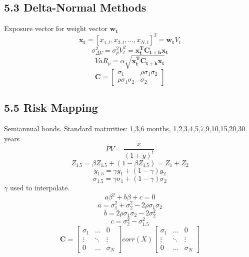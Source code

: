 \subsection*{5.3 Delta-Normal Methods}
Exposure vector for weight vector $\mathbf{w_t}$
\[\mathbf{x_t}=[x_{1,t}, x_{2,t}, ..., x_{N,t}]^T=\mathbf{w_t}V_t\]
\[\sigma_{\Delta V}^2 = \sigma_p^2 V_t^2 = \mathbf{x_t^T C_{t+h}x_t}\]
\[VaR_p = \alpha\sqrt{\mathbf{x_t^T C_{t+h}x_t}}\]
\[\mathbf{C}= 
\begin{bmatrix}
    \sigma_1 & \rho\sigma_1 \sigma_2 \\
    \rho\sigma_1 \sigma_2 & \sigma_2 
\end{bmatrix}
\]

\subsection*{5.5 Risk Mapping}
Semiannual bonds.
Standard maturities: 
1,3,6 months, 
1,2,3,4,5,7,9,10,15,20,30 years
\[PV=\frac{x}{(1+y)^t}\]
\[Z_{1.5} = \beta Z_{1.5} + (1-\beta Z_{1.5}) = Z_1 + Z_2\]
\[y_{1.5} = \gamma y_1 + (1-\gamma)y_2\]
\[\sigma_{1.5} = \gamma\sigma_1 + (1-\gamma)\sigma_2\]
$\gamma$ used to interpolate.
\[a\beta^2 + b\beta + c=0\]
\[a=\sigma_1^2 + \sigma_2^2 - 2\rho\sigma_1\sigma_2\]
\[b=2\rho \sigma_1\sigma_2-2\sigma_2^2\]
\[c=\sigma_2^2-\sigma_{1.5}^2\]
\[\mathbf{C} =
\begin{bmatrix}
    \sigma_1 & \dots & 0 \\
    \vdots & \ddots & \vdots \\
    0 & \dots & \sigma_N 
\end{bmatrix}
corr(X)
\begin{bmatrix}
    \sigma_1 & \dots & 0 \\
    \vdots & \ddots & \vdots \\
    0 & \dots & \sigma_N 
\end{bmatrix}
\]